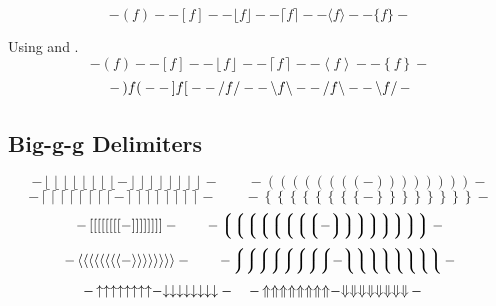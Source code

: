 	\def\testdelim#1#2{ - #1 f #2 - }
	\begin{displaymath}
	  \testdelim()
	  \testdelim[]
	  \testdelim\lfloor\rfloor
	  \testdelim\lceil\rceil
	  \testdelim\langle\rangle
	  \testdelim\{\}
	\end{displaymath}

	Using {\tt\string\left} and {\tt\string\right}.
	\def\testdelim#1#2{ - \left#1 f \right#2 - }
	\begin{displaymath}
	  \testdelim()
	  \testdelim[]
	  \testdelim\lfloor\rfloor
	  \testdelim\lceil\rceil
	  \testdelim\langle\rangle
	  \testdelim\{\}
	\end{displaymath}
	\begin{displaymath}
	  \testdelim)(
	  \testdelim][
	  \testdelim//
	  \testdelim\backslash\backslash
	  \testdelim/\backslash
	  \testdelim\backslash/
	\end{displaymath}

	\subsection{Big-g-g Delimiters \showfamily}

	\def\testdelim#1#2{%
	  - \left#1\left#1\left#1\left#1\left#1\left#1\left#1\left#1 -
	  \right#2\right#2\right#2\right#2\right#2\right#2\right#2\right#2 -}

	\begingroup
	\delimitershortfall-1pt
	\begin{displaymath}
	  \testdelim\lfloor\rfloor
	  \qquad
	  \testdelim()
	\end{displaymath}
	\begin{displaymath}
	  \testdelim\lceil\rceil
	  \qquad
	  \testdelim\{\}
	\end{displaymath}
	\begin{displaymath}
	  \testdelim[]
	  \qquad
	  \testdelim\lgroup\rgroup
	\end{displaymath}
	\begin{displaymath}
	  \testdelim\langle\rangle
	  \qquad
	  \testdelim\lmoustache\rmoustache
	\end{displaymath}
	\begin{displaymath}
	  \testdelim\uparrow\downarrow \quad
	  \testdelim\Uparrow\Downarrow \quad
	\end{displaymath}
	\endgroup %

	\def\X#1{$x #1 y$ &\tt\string#1}
	\def\Y#1{$\big#1$ &\tt\string#1}
	\def\Z#1{$x #1 y$}
	\def\W#1#2{$#1{#2}$ &\tt\string#1\string{#2\string}}

